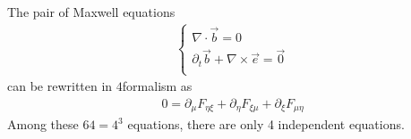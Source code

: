 \documentclass[letterpaper,10pt,english]{jupyterBook}
\begin{document}
\sphinxAtStartPar
The pair of Maxwell equations
\begin{equation*}
\begin{split}\begin{cases}
  \nabla \cdot \vec{b} = 0 \\
  \partial_t \vec{b} + \nabla \times \vec{e} = \vec{0} \\
\end{cases}\end{split}
\end{equation*}
\sphinxAtStartPar
can be re\sphinxhyphen{}written in \(4\)\sphinxhyphen{}formalism as
\begin{equation*}
\begin{split}0 = \partial_{\mu} F_{\eta \xi} + \partial_{\eta} F_{\xi \mu} + \partial_{\xi} F_{\mu \eta} \end{split}
\end{equation*}
\sphinxAtStartPar
Among these \(64 = 4^3\) equations, there are only 4 independent equations.
\end{document}
